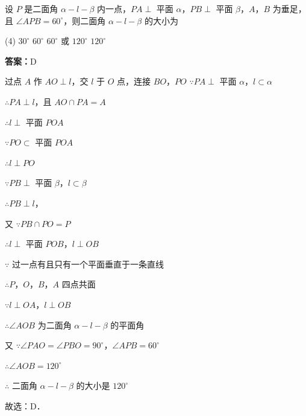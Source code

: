\vspace{2em}

\begin{example}[\bkstar{2}{5}]
设 $P$ 是二面角 $\alpha-l-\beta$ 内一点，$PA\perp$ 平面 $\alpha$，$PB\perp$ 平面 $\beta$，$A$，$B$ 为垂足，且 $\angle APB=60^{\circ}$，则二面角 $\alpha-l-\beta$ 的大小为
\begin{tasks}(4)
    \task $30^{\circ}$
    \task $60^{\circ}$
    \task $60^{\circ}$ 或 $120^{\circ}$
    \task $120^{\circ}$
\end{tasks}
\end{example}
\begin{solution}
\textbf{答案：}D

过点 $A$ 作 $AO\perp l$，交 $l$ 于 $O$ 点，连接 $BO$，$PO$
$\because PA\perp$ 平面 $\alpha$，$l\subset\alpha$

$\therefore PA\perp l$，且 $AO\cap PA=A$

$\therefore l\perp$ 平面 $POA$

$\because PO\subset$ 平面 $POA$

$\therefore l\perp PO$

$\because PB\perp$ 平面 $\beta$，$l\subset\beta$

$\therefore PB\perp l$，

又 $\because PB\cap PO=P$

$\therefore l\perp$ 平面 $POB$，$l\perp OB$

$\because$ 过一点有且只有一个平面垂直于一条直线

$\therefore P$，$O$，$B$，$A$ 四点共面

$\because l\perp OA$，$l\perp OB$

$\therefore \angle AOB$ 为二面角 $\alpha-l-\beta$ 的平面角

又 $\because \angle PAO=\angle PBO=90^{\circ}$，$\angle APB=60^{\circ}$

$\therefore \angle AOB=120^{\circ}$

$\therefore$ 二面角 $\alpha-l-\beta$ 的大小是 $120^{\circ}$

故选：D．
\end{solution}

\vspace{2em}

